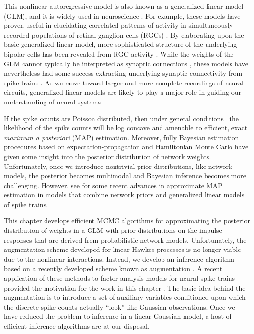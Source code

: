 This nonlinear autoregressive model is also known as a generalized
linear model (GLM), and it is widely used in neuroscience
\citep{Paninski-2004, Truccolo-2005}. For example, these models have
proven useful in elucidating correlated patterns of activity in
simultaneously recorded populations of retinal ganglion cells (RGCs)
\citep{Pillow-2008}.  By elaborating upon the basic generalized linear
model, more sophisticated structure of the underlying bipolar cells
has been revealed from RGC activity \citep{freeman2015mapping}.  While the weights of
the GLM cannot typically be interpreted as synaptic connections
\citep{vidne2012modeling}, these models have nevertheless had some
success extracting underlying synaptic connectivity from spike trains
\citep{Gerhard-2013, fletcher2011neural, soudry2015efficient}.  As we
move toward larger and more complete recordings of neural circuits,
generalized linear models are likely to play a major role in guiding our
understanding of neural systems.

If the spike
counts are Poisson distributed, then under general
conditions~\citep{Paninski-2004} the likelihood of the spike counts
will be log concave and amenable to efficient, exact
\emph{maximum a posteriori} (MAP) estimation. 
Moreover, fully Bayesian estimation procedures based on 
expectation-propagation \citep{gerwinn2008bayesian}
and Hamiltonian Monte Carlo \citep{ahmadian2011efficient}
have given some insight into the posterior distribution of 
network weights. 
Unfortunately, once we introduce nontrivial prior
distributions, like network models, the
posterior becomes multimodal and Bayesian inference becomes more
challenging. However, see \citet{soudry2015efficient} for 
some recent advances in approximate MAP estimation in models that combine 
network priors and generalized linear models of spike trains.

This chapter develops efficient MCMC algorithms for approximating the
posterior distribution of weights in a GLM with prior distributions on
the impulse responses that are derived from probabilistic network
models.  Unfortunately, the augmentation scheme developed for linear
Hawkes processes is no longer viable due to the nonlinear
interactions. Instead, we develop an inference algorithm based on a
recently developed scheme known as \polyagamma augmentation
\citep{polson2013bayesian}. A recent application of these methods to 
factor analysis models for neural spike trains provided the 
motivation for the work in this chapter \citep{Pillow2012}.
The basic idea behind the \polyagamma augmentation is to
introduce a set of auxiliary variables conditioned upon which the
discrete spike counts actually ``look'' like Gaussian observations.
Once we have reduced the problem to inference in a linear Gaussian
model, a host of efficient inference algorithms are at our disposal.


